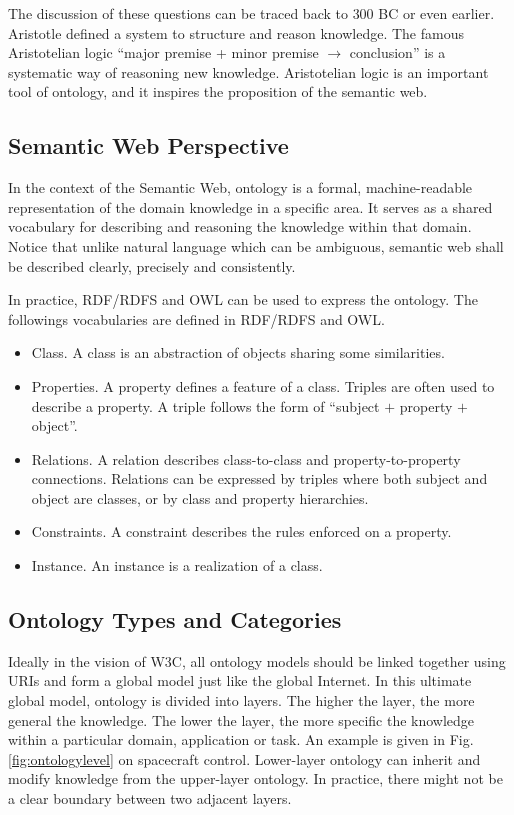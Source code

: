 The discussion of these questions can be traced back to $300$ BC or even earlier. Aristotle defined a system to structure and reason knowledge. The famous Aristotelian logic ``major premise + minor premise $\rightarrow$ conclusion'' is a systematic way of reasoning new knowledge. Aristotelian logic is an important tool of ontology, and it inspires the proposition of the semantic web.


\subsection{Semantic Web Perspective}

In the context of the Semantic Web, ontology is a formal, machine-readable representation of the domain knowledge in a specific area. It serves as a shared vocabulary for describing and reasoning the knowledge within that domain. Notice that unlike natural language which can be ambiguous, semantic web shall be described clearly, precisely and consistently.

In practice, RDF/RDFS and OWL can be used to express the ontology. The followings vocabularies are defined in RDF/RDFS and OWL.
\begin{itemize}
  \item Class. A class is an abstraction of objects sharing some similarities.
  \item Properties. A property defines a feature of a class. Triples are often used to describe a property. A triple follows the form of ``subject $+$ property $+$ object''.
  \item Relations. A relation describes class-to-class and property-to-property connections. Relations can be expressed by triples where both subject and object are classes, or by class and property hierarchies.
  \item Constraints. A constraint describes the rules enforced on a property.
  \item Instance. An instance is a realization of a class.
\end{itemize}

\subsection{Ontology Types and Categories}

Ideally in the vision of W3C, all ontology models should be linked together using URIs and form a global model just like the global Internet. In this ultimate global model, ontology is divided into layers. The higher the layer, the more general the knowledge. The lower the layer, the more specific the knowledge within a particular domain, application or task. An example is given in Fig. \ref{fig:ontologylevel} on spacecraft control. Lower-layer ontology can inherit and modify knowledge from the upper-layer ontology. In practice, there might not be a clear boundary between two adjacent layers.

